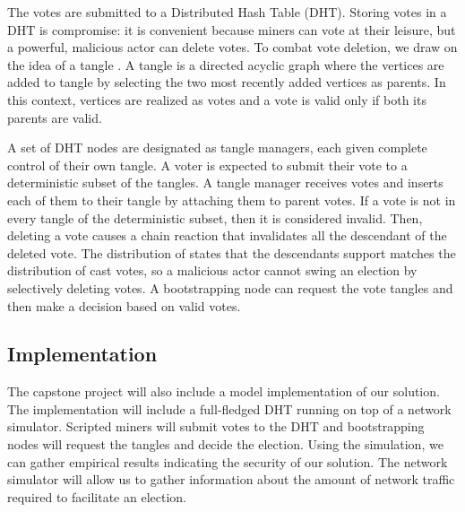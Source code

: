 The votes are submitted to a Distributed Hash Table (DHT).
Storing votes in a DHT is compromise: it is convenient because miners can vote at their leisure, but a powerful, malicious actor can delete votes.
To combat vote deletion, we draw on the idea of a tangle \cite{popov2016Tangle}.
A tangle is a directed acyclic graph where the vertices are added to tangle by selecting the two most recently added vertices as parents.
In this context, vertices are realized as votes and a vote is valid only if both its parents are valid.



A set of DHT nodes are designated as tangle managers, each given complete control of their own tangle.
A voter is expected to submit their vote to a deterministic subset of the tangles.
A tangle manager receives votes and inserts each of them to their tangle by attaching them to parent votes.
If a vote is not in every tangle of the deterministic subset, then it is considered invalid.
Then, deleting a vote causes a chain reaction that invalidates all the descendant of the deleted vote.
The distribution of states that the descendants support matches the distribution of cast votes, so a malicious actor cannot swing an election by selectively deleting votes.
A bootstrapping node can request the vote tangles and then make a decision based on valid votes.

\subsection{Implementation}

The capstone project will also include a model implementation of our solution.
The implementation will include a full-fledged DHT running on top of a network simulator.
Scripted miners will submit votes to the DHT and bootstrapping nodes will request the tangles and decide the election.
Using the simulation, we can gather empirical results indicating the security of our solution.
The network simulator will allow us to gather information about the amount of network traffic required to facilitate an election.